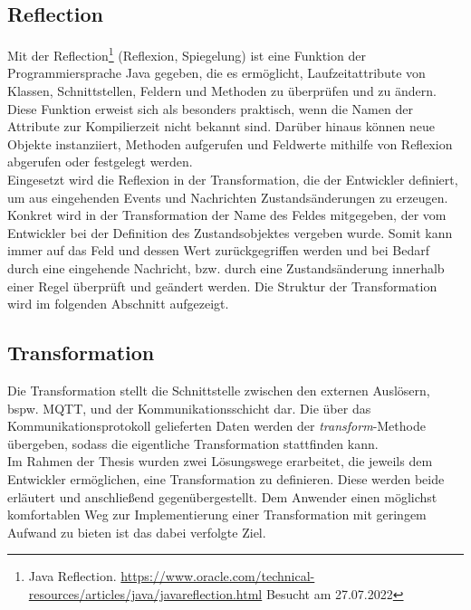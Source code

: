 \subsection{Reflection} 
\label{subsec:reflection}
    Mit der Reflection\footnote{Java Reflection. \url{https://www.oracle.com/technical-resources/articles/java/javareflection.html} Besucht am 27.07.2022} 
    (Reflexion, Spiegelung) ist eine Funktion der Programmiersprache Java gegeben, die es ermöglicht, Laufzeitattribute von Klassen, Schnittstellen, Feldern 
    und Methoden zu überprüfen und zu ändern. Diese Funktion erweist sich als besonders praktisch, wenn die Namen der Attribute zur Kompilierzeit nicht bekannt sind. 
    Darüber hinaus können neue Objekte instanziiert, Methoden aufgerufen und Feldwerte mithilfe von Reflexion abgerufen oder festgelegt werden. 
    \\
    \linebreak
    Eingesetzt wird die Reflexion in der Transformation, die der Entwickler definiert, um aus eingehenden Events und Nachrichten Zustandsänderungen zu erzeugen. Konkret wird in der 
    Transformation der Name des Feldes mitgegeben, der vom Entwickler bei der Definition des Zustandsobjektes vergeben wurde. Somit kann immer auf das Feld und dessen Wert 
    zurückgegriffen werden und bei Bedarf durch eine eingehende Nachricht, bzw. durch eine Zustandsänderung innerhalb einer Regel überprüft und geändert werden. Die Struktur der 
    Transformation wird im folgenden Abschnitt aufgezeigt.

\subsection{Transformation}
\label{subsec:transformation}
    Die Transformation stellt die Schnittstelle zwischen den externen Auslösern, bspw. \acs{MQTT}, und der Kommunikationsschicht dar. 
    Die über das Kommunikationsprotokoll gelieferten Daten werden der \textit{transform}-Methode übergeben, sodass die eigentliche 
    Transformation stattfinden kann. %
    \\
    \linebreak
    Im Rahmen der Thesis wurden zwei Lösungswege erarbeitet, die jeweils dem Entwickler ermöglichen, eine Transformation zu definieren. Diese werden beide 
    erläutert und anschließend gegenübergestellt. Dem Anwender einen möglichst komfortablen Weg zur Implementierung einer Transformation mit geringem Aufwand zu bieten ist das dabei verfolgte Ziel. 

